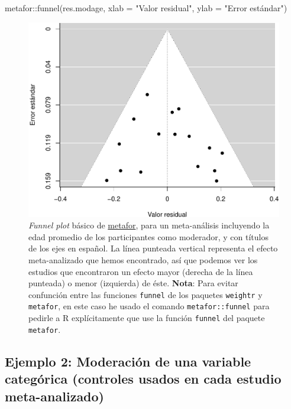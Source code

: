 \documentclass[
  bookmarksnumbered]{article}
\newenvironment{Shaded}{\begin{snugshade}}{\end{snugshade}}
\newcommand{\AttributeTok}[1]{\textcolor[rgb]{0.00,0.34,0.68}{#1}}
\newcommand{\FunctionTok}[1]{\textcolor[rgb]{0.39,0.29,0.61}{#1}}
\newcommand{\NormalTok}[1]{\textcolor[rgb]{0.12,0.11,0.11}{#1}}
\newcommand{\SpecialCharTok}[1]{\textcolor[rgb]{0.24,0.68,0.91}{#1}}
\newcommand{\StringTok}[1]{\textcolor[rgb]{0.75,0.01,0.01}{#1}}
\begin{document}
\begin{Shaded}
\begin{Highlighting}[]
\NormalTok{metafor}\SpecialCharTok{::}\FunctionTok{funnel}\NormalTok{(res.modage,}
                \AttributeTok{xlab =} \StringTok{"Valor residual"}\NormalTok{,}
                \AttributeTok{ylab =} \StringTok{"Error estándar"}\NormalTok{)}
\end{Highlighting}
\end{Shaded}

\begin{figure}
\centering
\includegraphics{Meta-analysis_files/figure-latex/funnel-plot-mod1-1.pdf}
\caption{\label{fig:funnel-plot-mod1}\emph{Funnel plot} básico de \href{https://www.metafor-project.org/doku.php}{metafor}, para un meta-análisis incluyendo la edad promedio de los participantes como moderador, y con títulos de los ejes en español. La línea punteada vertical representa el efecto meta-analizado que hemos encontrado, así que podemos ver los estudios que encontraron un efecto mayor (derecha de la línea punteada) o menor (izquierda) de éste. \textbf{Nota}: Para evitar confunción entre las funciones \texttt{funnel} de los paquetes \texttt{weightr} y \texttt{metafor}, en este caso he usado el comando \texttt{metafor::funnel} para pedirle a R explícitamente que use la función \texttt{funnel} del paquete \texttt{metafor}.}
\end{figure}

\hypertarget{ejemplo-2-moderaciuxf3n-de-una-variable-categuxf3rica-controles-usados-en-cada-estudio-meta-analizado}{%
\subsection{Ejemplo 2: Moderación de una variable categórica (controles usados en cada estudio meta-analizado)}\label{ejemplo-2-moderaciuxf3n-de-una-variable-categuxf3rica-controles-usados-en-cada-estudio-meta-analizado}}
\end{document}

